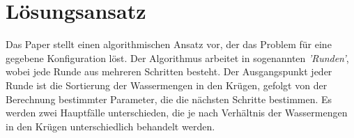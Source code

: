 \chapter{Lösungsansatz} 
Das Paper stellt einen algorithmischen Ansatz vor, der das Problem für eine gegebene Konfiguration löst. Der Algorithmus arbeitet in sogenannten \emph{'Runden'}, wobei jede Runde aus mehreren Schritten besteht. Der Ausgangspunkt jeder Runde ist die Sortierung der Wassermengen in den Krügen, gefolgt von der Berechnung bestimmter Parameter, die die nächsten Schritte bestimmen. Es werden zwei Hauptfälle unterschieden, die je nach Verhältnis der Wassermengen in den Krügen unterschiedlich behandelt werden.




